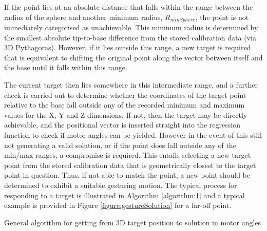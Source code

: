 \documentclass[11pt]{article}
\begin{document}
If the point lies at an absolute distance that falls within the range between the radius of the sphere and another minimum radius, $R_{minSphere}$, the point is not immediately categorised as unachievable. This minimum radius is determined by the smallest absolute tip-to-base difference from the stored calibration data (via 3D Pythagoras). However, if it lies outside this range, a new target is required that is equivalent to shifting the original point along the vector between itself and the base until it falls within this range. 

The current target then lies somewhere in this intermediate range, and a further check is carried out to determine whether the coordinates of the target point relative to the base fall outside any of the recorded minimum and maximum values for the X, Y and Z dimensions. If not, then the target may be directly achievable, and the positional vector is inserted straight into the regression function to check if motor angles can be yielded. However in the event of this still not generating a valid solution, or if the point does fall outside any of the min/max ranges, a compromise is required. This entails selecting a new target point from the stored calibration data that is geometrically closest to the target point in question. Thus, if not able to match the point, a new point should be determined to exhibit a suitable gesturing motion. The typical process for responding to a target is illustrated in Algorithm \ref{algorithm:1} and a typical example is provided in Figure \ref{figure:gestureSolution} for a far-off point.

\begin{algorithm}
\begin{algorithmic}
\ENDIF
{}
\ENDIF
{}
\ENDIF
{}
\ENDWHILE
\end{algorithmic}
\caption{General algorithm for getting from 3D target position to solution in motor angles}
\label{algorithm:1}
\end{algorithm}
\end{document}
